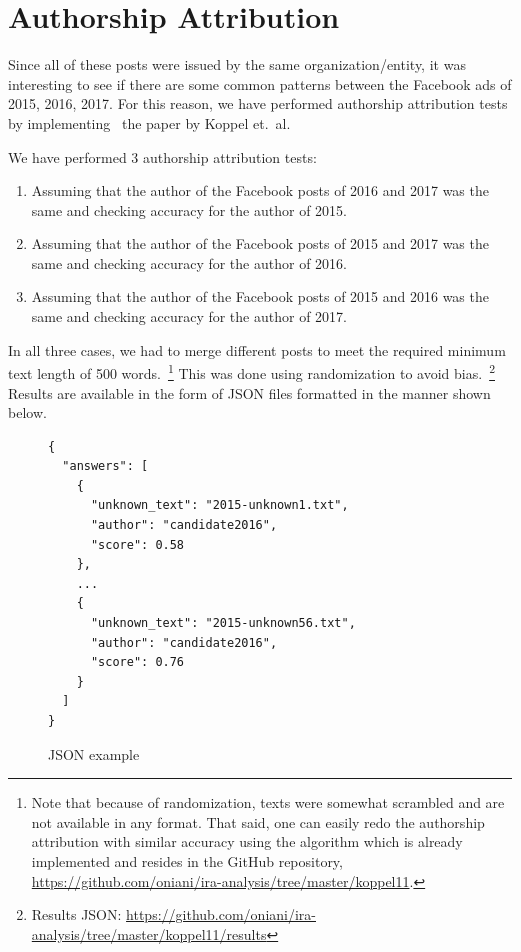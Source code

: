 \documentclass{article}
\begin{document}

\section*{\centering Authorship Attribution}

Since all of these posts were issued by the same organization/entity, it was
interesting to see if there are some common patterns between the Facebook ads
of 2015, 2016, 2017. For this reason, we have performed authorship attribution
tests by implementing~\cite{koppel11} the paper by Koppel et.~al.

\bigskip

We have performed 3 authorship attribution tests:

\begin{enumerate}
  \item Assuming that the author of the Facebook posts of 2016 and 2017 was the
        same and checking accuracy for the author of 2015.

  \item Assuming that the author of the Facebook posts of 2015 and 2017 was the
        same and checking accuracy for the author of 2016.

  \item Assuming that the author of the Facebook posts of 2015 and 2016 was the
        same and checking accuracy for the author of 2017.
\end{enumerate}

In all three cases, we had to merge different posts to meet the required
minimum text length of 500 words.~\footnote{Note that because of randomization,
texts were somewhat scrambled and are not available in any format. That said,
one can easily redo the authorship attribution with similar accuracy using the
algorithm which is already implemented and resides in the GitHub repository,
\url{https://github.com/oniani/ira-analysis/tree/master/koppel11}.} This was
done using randomization to avoid bias.~\footnote{Results JSON:
\url{https://github.com/oniani/ira-analysis/tree/master/koppel11/results}}
Results are available in the form of JSON files formatted in the manner shown
below.

\begin{figure}[H]
\begin{verbatim}
{
  "answers": [
    {
      "unknown_text": "2015-unknown1.txt",
      "author": "candidate2016",
      "score": 0.58
    },
    ...
    {
      "unknown_text": "2015-unknown56.txt",
      "author": "candidate2016",
      "score": 0.76
    }
  ]
}
\end{verbatim}
\caption{JSON example}
\end{figure}
\end{document}
